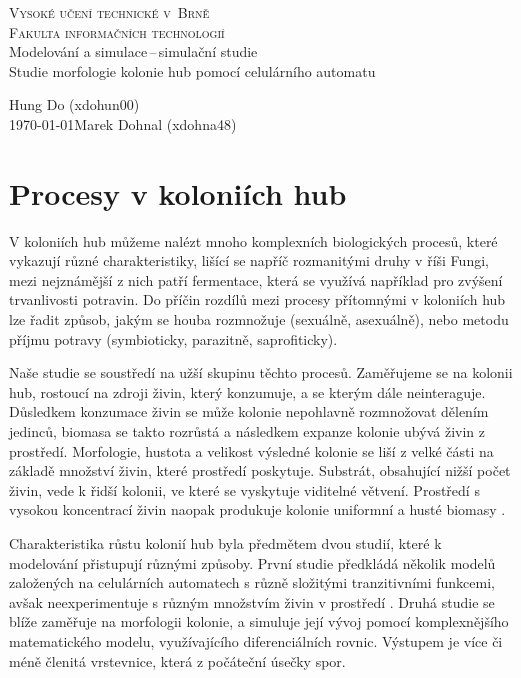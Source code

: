 \documentclass{article}
\begin{document}
\begin{titlepage}
    \begin{center}
        \huge \textsc{Vysoké učení technické v~Brně\\
        \huge Fakulta informačních technologií}\\
        \LARGE Modelování a simulace\,--\,simulační studie\\
        \Huge Studie morfologie kolonie hub pomocí celulárního automatu\\
    \end{center}
    \Large \hfill Hung Do (xdohun00) \\
    {\Large \today \hfill Marek Dohnal (xdohna48)}
\end{titlepage}

\tableofcontents
\newpage

\section{Procesy v koloniích hub}
V koloniích hub můžeme nalézt mnoho komplexních biologických procesů, které vykazují různé charakteristiky, lišící se napříč rozmanitými druhy v říši Fungi, mezi nejznámější z nich patří fermentace, která se využívá například pro zvýšení trvanlivosti potravin. Do příčin rozdílů mezi procesy přítomnými v koloniích hub lze řadit způsob, jakým se houba rozmnožuje (sexuálně, asexuálně), nebo metodu příjmu potravy (symbioticky, parazitně, saprofiticky). 

Naše studie se soustředí na užší skupinu těchto procesů. Zaměřujeme se na kolonii hub, rostoucí na zdroji živin, který konzumuje, a se kterým dále neinteraguje. Důsledkem konzumace živin se může kolonie nepohlavně rozmnožovat dělením jedinců, biomasa se takto rozrůstá a následkem expanze kolonie ubývá živin z prostředí. Morfologie, hustota a velikost výsledné kolonie se liší z velké části na základě množství živin, které prostředí poskytuje. Substrát, obsahující nižší počet živin, vede k řidší kolonii, ve které se vyskytuje viditelné větvení. Prostředí s vysokou koncentrací živin naopak produkuje kolonie uniformní a husté biomasy \cite{solidSubstrates} \cite{morphological}. 

Charakteristika růstu kolonií hub byla předmětem dvou studií, které k modelování přistupují různými způsoby. První studie předkládá několik modelů založených na celulárních automatech s různě složitými tranzitivními funkcemi, avšak neexperimentuje s různým množstvím živin v prostředí \cite{solidSubstrates}. 
Druhá studie se blíže zaměřuje na morfologii kolonie, a simuluje její vývoj pomocí komplexnějšího matematického modelu, využívajícího diferenciálních rovnic. Výstupem je více či méně členitá vrstevnice, která  z počáteční úsečky spor. \cite{morphological}
\end{document}
